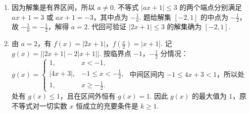 \begin{solution}
\begin{enumerate}
\item 因为解集是有界区间，所以 \(a\neq0\). 不等式 \(|ax+1|\leqslant3\) 的两个端点分别满足 \(ax+1=3\) 或 \(ax+1=-3\)，其中点为 \(-\frac{1}{a}\). 题给解集 \([-2,1]\) 的中点为 \(-\frac{1}{2}\)，故 \(-\frac{1}{a}=-\frac{1}{2}\)，解得 \(a=2\). 代回可验证 \(|2x+1|\leqslant3\) 的解集确为 \([-2,1]\).
\item 由 \(a=2\)，有 \(f(x)=|2x+1|\)，\(f\left(\frac{x}{2}\right)=|x+1|\). 记
\(\displaystyle g(x)=\left||2x+1|-2|x+1|\right|\). 按临界点 \(-1\)，\(-\frac12\) 分情况：
\(\displaystyle g(x)=\begin{cases}
1,&x<-1,\\
|4x+3|,&-1\leqslant x<-\frac{1}{2},\\
1,&x\geqslant-\frac{1}{2}.
\end{cases}\)
中间区间内 \(-1\leqslant4x+3<1\)，所以处处有 \(g(x)\leqslant1\)，且在区间外恒有 \(g(x)=1\). 因此 \(g(x)\) 的最大值为 \(1\)，原不等式对一切实数 \(x\) 恒成立的充要条件是 \(k\geqslant1\).
\end{enumerate}
\end{solution}

